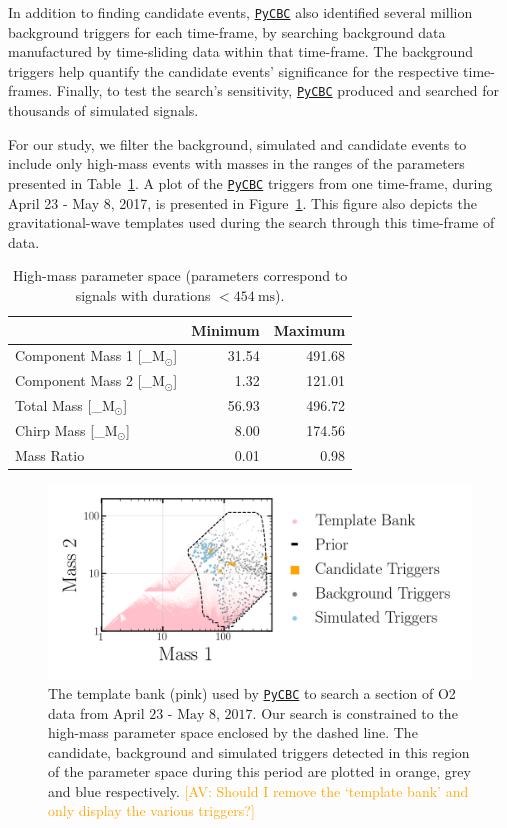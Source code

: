 \documentclass[%
 nofootinbib,
 amsmath,amssymb,
 aps,
 twocolumn
]{revtex4-2}
\newcommand{\pycbc}{{\sc \href{https://pycbc.org/}{\texttt{PyCBC}}}\xspace}
\newcommand{\mathcmd}[1]{{\sc \relax\ifmmode#1\else $#1$\fi}\xspace}
\newcommand{\msun}{\mathcmd{\text{M}_\odot}}
\newcommand{\avi}[1]{\textcolor{orange}{[AV: #1]}}
\begin{document}
In addition to finding candidate events, \pycbc also identified several million background triggers for each time-frame, by searching background data manufactured by time-sliding data within that time-frame. The background triggers help quantify the candidate events' significance for the respective time-frames. Finally, to test the search's sensitivity, \pycbc produced and searched for thousands of simulated signals. 

For our study, we filter the background, simulated and candidate events to include only high-mass events with masses in the ranges of the parameters presented in Table~\ref{tab:parameters}. A plot of the \pycbc triggers from one time-frame, during April 23 - May 8, 2017, is presented in Figure~\ref{fig:templateBank}. This figure also depicts the gravitational-wave templates used during the search through this time-frame of data. 

\begin{table}[t]

\caption[BBH parameters correspond to duration $<454\ \text{ms}$]{\label{tab:parameters}High-mass parameter space (parameters correspond to signals with durations $<454 \ \text{ms}$). }
\centering
\begin{tabular}{lrr}
\toprule
  & Minimum & Maximum\\
\midrule
Component Mass 1 [\msun] & 31.54 & 491.68\\
Component Mass 2 [\msun] & 1.32 & 121.01\\
Total Mass [\msun] & 56.93 & 496.72\\
Chirp Mass [\msun] & 8.00 & 174.56\\
Mass Ratio & 0.01 & 0.98\\
\end{tabular}
\end{table}



\begin{figure}[!ht]

{\centering \includegraphics[width=0.75\linewidth]{images/template_bank.png}

}
\caption[High-mass BCR search space.]{The template bank (pink) used by \pycbc to search a section of O2 data from $\text{April 23 - May 8, 2017}$. Our search is constrained to the high-mass parameter space enclosed by the dashed line. The candidate, background and simulated triggers detected in this region of the parameter space during this period are plotted in orange, grey and blue respectively.  \avi{Should I remove the `template bank' and only display the various triggers?}}\label{fig:templateBank}
\end{figure}
\end{document}
